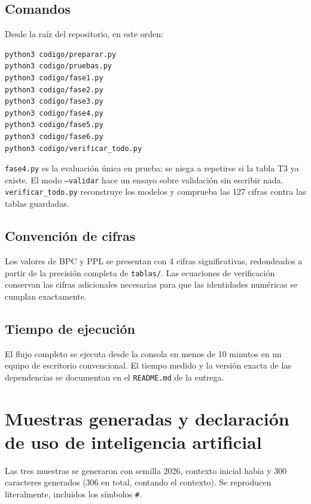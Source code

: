 \documentclass[11pt,letterpaper]{article}
\begin{document}
\subsection*{Comandos}

Desde la raíz del repositorio, en este orden:
\begin{Verbatim}[fontsize=\small,frame=single,breaklines=true]
python3 codigo/preparar.py
python3 codigo/pruebas.py
python3 codigo/fase1.py
python3 codigo/fase2.py
python3 codigo/fase3.py
python3 codigo/fase4.py
python3 codigo/fase5.py
python3 codigo/fase6.py
python3 codigo/verificar_todo.py
\end{Verbatim}

\texttt{fase4.py} es la evaluación única en prueba: se niega a repetirse si la tabla T3 ya existe. El modo \texttt{--validar} hace un ensayo sobre validación sin escribir nada. \texttt{verificar\_todo.py} reconstruye los modelos y comprueba las 127 cifras contra las tablas guardadas.

\subsection*{Convención de cifras}

Los valores de BPC y PPL se presentan con 4 cifras significativas, redondeados a partir de la precisión completa de \texttt{tablas/}. Las ecuaciones de verificación conservan las cifras adicionales necesarias para que las identidades numéricas se cumplan exactamente.

\subsection*{Tiempo de ejecución}

El flujo completo se ejecuta desde la consola en menos de 10 minutos en un equipo de escritorio convencional. El tiempo medido y la versión exacta de las dependencias se documentan en el \texttt{README.md} de la entrega.

\section{Muestras generadas y declaración de uso de inteligencia artificial}\label{anexo:muestras}

Las tres muestras se generaron con semilla 2026, contexto inicial \guillemotleft{}habia \guillemotright{} y 300 caracteres generados (306 en total, contando el contexto). Se reproducen literalmente, incluidos los símbolos \texttt{\#}.
\end{document}

